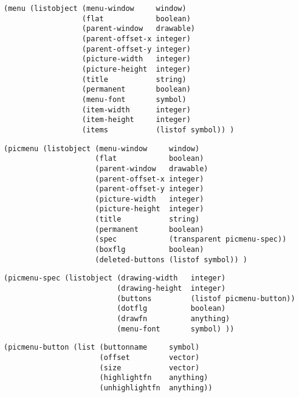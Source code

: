 \vspace*{-.2in}

\begin{verbatim}
(menu (listobject (menu-window     window)
                  (flat            boolean)
                  (parent-window   drawable)
                  (parent-offset-x integer)
                  (parent-offset-y integer)
                  (picture-width   integer)
                  (picture-height  integer)
                  (title           string)
                  (permanent       boolean)
                  (menu-font       symbol)
                  (item-width      integer)
                  (item-height     integer)
                  (items           (listof symbol)) )
\end{verbatim}

\vspace*{-.2in}

\begin{verbatim}
(picmenu (listobject (menu-window     window)
                     (flat            boolean)
                     (parent-window   drawable)
                     (parent-offset-x integer)
                     (parent-offset-y integer)
                     (picture-width   integer)
                     (picture-height  integer)
                     (title           string)
                     (permanent       boolean)
                     (spec            (transparent picmenu-spec))
                     (boxflg          boolean)
                     (deleted-buttons (listof symbol)) )
\end{verbatim}

\vspace*{-.2in}

\begin{verbatim}
(picmenu-spec (listobject (drawing-width   integer)
                          (drawing-height  integer)
                          (buttons         (listof picmenu-button))
                          (dotflg          boolean)
                          (drawfn          anything)
                          (menu-font       symbol) ))
\end{verbatim}

\vspace*{-.2in}

\begin{verbatim}
(picmenu-button (list (buttonname     symbol)
                      (offset         vector)
                      (size           vector)
                      (highlightfn    anything)
                      (unhighlightfn  anything))
\end{verbatim}

